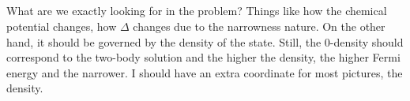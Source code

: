 \subsection{}
What are we exactly looking for in the problem? Things like how the chemical potential changes, how $\Delta$ changes due to the narrowness nature.  On the other hand, it should be governed by the density of the state.  Still, the 0-density should correspond to the two-body solution and the higher the density, the higher Fermi energy and the narrower.  I should have an extra coordinate for most pictures, the density.  